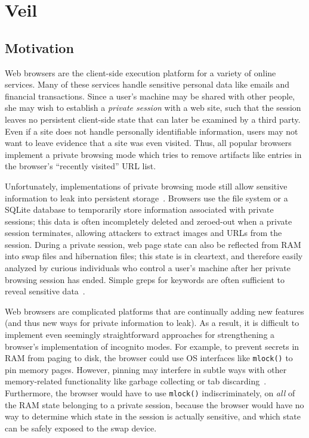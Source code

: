 \section{Veil}

\subsection{Motivation}

Web browsers are the client-side execution platform
for a variety of online services. Many of these
services handle sensitive personal data like emails
and financial transactions. Since a user's machine
may be shared with other people, she may wish to
establish a \emph{private session} with a web site,
such that the session leaves no persistent
client-side state that can later be examined by a
third party. Even if a site does not handle
personally identifiable information, users may
not want to leave evidence that a site was even
visited. Thus, all popular browsers implement a
private browsing mode which tries to remove
artifacts like entries in the browser's ``recently
visited'' URL list.

Unfortunately, implementations of private browsing
mode still allow sensitive information to leak into
persistent storage~\cite{aggarwal10,dt2016,magnetForensicsChrome,ohana13}.
Browsers use the file system or a SQLite database
to temporarily store information associated with private
sessions; this data is often incompletely deleted
and zeroed-out when a private session terminates,
allowing attackers to extract images and URLs from
the session. During a private session, web page
state can also be reflected from RAM into swap
files and hibernation files; this state is in cleartext,
and therefore easily analyzed by curious individuals
who control a user's machine after her private
browsing session has ended. Simple greps for
keywords are often sufficient to reveal sensitive
data~\cite{aggarwal10,dt2016}.

Web browsers are complicated platforms that are
continually adding new features (and thus new ways
for private information to leak). As a result, it is
difficult to implement even seemingly straightforward
approaches for strengthening a browser's implementation
of incognito modes. For example, to prevent secrets in
RAM from paging to disk, the browser could use OS
interfaces like \texttt{mlock()} to pin memory pages.
However, pinning may interfere in subtle ways with other
memory-related functionality like garbage collecting or
tab discarding~\cite{tabDiscarding}.
Furthermore, the browser would have to use \texttt{mlock()}
indiscriminately, on \textit{all} of the RAM state
belonging to a private session, because the browser would
have no way to determine which state in the session is
actually sensitive, and which state can be safely
exposed to the swap device.

